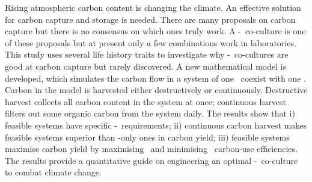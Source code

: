 \documentclass[env.tex]{subfiles}
\begin{document}
Rising atmospheric carbon content is changing the climate.  An effective solution for carbon capture and storage is needed.  There are many proposals on carbon capture but there is no consensus on which ones truly work.  A \phy-\bac\ co-culture is one of these proposals but at present only a few combinations work in laboratories.  This study uses several life history traits to investigate why \phy-\bac\ co-cultures are good at carbon capture but rarely discovered.  A new mathematical model is developed, which simulates the carbon flow in a system of one \phy\ coexist with one \bacm.  Carbon in the model is harvested either destructively or continuously.  Destructive harvest collects all carbon content in the system at once; continuous harvest filters out some organic carbon from the system daily.  The results show that \Rn{1}) feasible systems have specific \phy-\bac\ requirements; \Rn{2}) continuous carbon harvest makes feasible systems superior than \phy-only ones in carbon yield; \Rn{3}) feasible systems maximise carbon yield by maximising \phy\ and minimising \bac\ carbon-use efficiencies.  The results provide a quantitative guide on engineering an optimal \phy-\bac\ co-culture to combat climate change.
\end{document}
